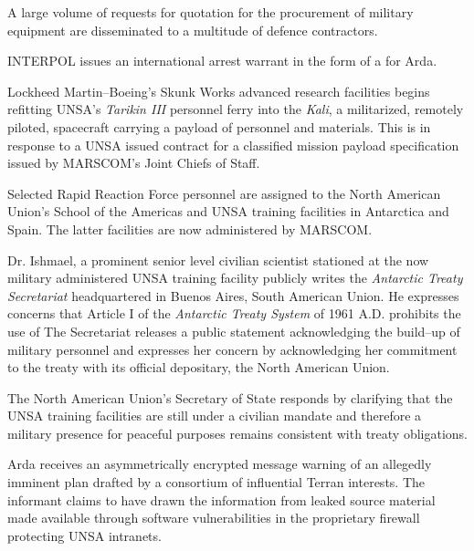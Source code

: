 A large volume of requests for quotation for the procurement of military equipment are disseminated to a multitude of defence contractors.
\StopTimelineDate

INTERPOL issues an international arrest warrant in the form of a  for Arda.
\StopTimelineDate

Lockheed Martin--Boeing's Skunk Works advanced research facilities begins refitting UNSA's {\it Tarikin III} personnel ferry into the {\it Kali}, a militarized, remotely piloted, spacecraft carrying a payload of personnel and materials. This is in response to a UNSA issued contract for a classified mission payload specification issued by MARSCOM's Joint Chiefs of Staff.
\StopTimelineDate

Selected Rapid Reaction Force personnel are assigned to the North American Union's School of the Americas and UNSA training facilities in Antarctica and Spain. The latter facilities are now administered by MARSCOM.

Dr. Ishmael, a prominent senior level civilian scientist stationed at the now military administered UNSA training facility publicly writes the {\it Antarctic Treaty Secretariat} headquartered in Buenos Aires, South American Union. He expresses concerns that Article I of the {\it Antarctic Treaty System} of 1961 A.D. prohibits the use of  The Secretariat releases a public statement acknowledging the build--up of military personnel and expresses her concern by acknowledging her commitment to the treaty with its official depositary, the North American Union.

The North American Union's Secretary of State responds by clarifying that the UNSA training facilities are still under a civilian mandate and therefore a military presence for peaceful purposes remains consistent with treaty obligations.
\StopTimelineDate

Arda receives an asymmetrically encrypted message warning of an allegedly imminent plan drafted by a consortium of influential Terran interests. The informant claims to have drawn the information from leaked source material made available through software vulnerabilities in the proprietary firewall protecting UNSA intranets. 

